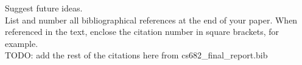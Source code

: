 \documentclass[10pt,twocolumn,letterpaper]{article}
\begin{document}
Suggest future ideas.\\

List and number all bibliographical references at the end of your paper. When referenced in the text,
enclose the citation number in square brackets, for
example. \\

TODO: add the rest of the citations here from cs682\_final\_report.bib

\cite{slavkovikj2014image}
\cite{patterson2014sun}
\cite{rundle2011using}
\cite{zhou2017places}
\cite{DBLP:journals/corr/ZhouKLOT14}
\cite{DBLP:journals/corr/Wang15l}
\cite{DBLP:journals/corr/HeZRS15}
\cite{DBLP:journals/corr/ZagoruykoK16}
\cite{DBLP:journals/corr/ZhouKLTO16}
\cite{koehrsen2018blog}

{\small


}
\end{document}
